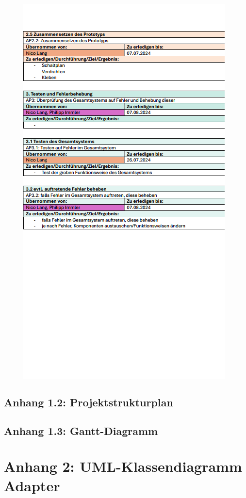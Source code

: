 \documentclass[11pt, twoside]{article}
\begin{document}
\begin{figure}[H]  
    \centering
    \includegraphics[height=\textheight]{ap_3.png}
\end{figure}
\subsection{Anhang 1.2: Projektstrukturplan}
\subsection{Anhang 1.3: Gantt-Diagramm}
\section{Anhang 2: UML-Klassendiagramm Adapter}
\end{document}

